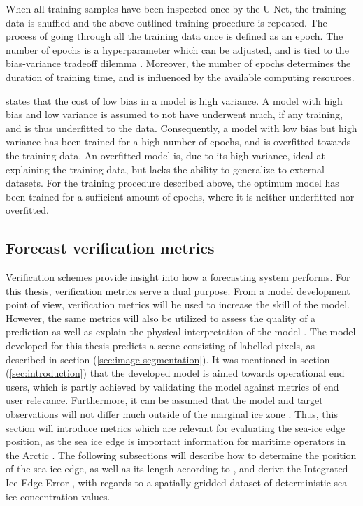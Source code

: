 \documentclass[../main/thesis.tex]{subfiles}
\begin{document}
When all training samples have been inspected once by the U-Net, the training data is shuffled and the above outlined training procedure is repeated. The process of going through all the training data once is defined as an epoch. The number of epochs is a hyperparameter which can be adjusted, and is tied to the bias-variance tradeoff dilemma \citep{Geman1992}. Moreover, the number of epochs determines the duration of training time, and is influenced by the available computing resources.

\citet{Geman1992} states that the cost of low bias in a model is high variance. A model with high bias and low variance is assumed to not have underwent much, if any training, and is thus underfitted to the data. Consequently, a model with low bias but high variance has been trained for a high number of epochs, and is overfitted towards the training-data. An overfitted model is, due to its high variance, ideal at explaining the training data, but lacks the ability to generalize to external datasets. For the training procedure described above, the optimum model has been trained for a sufficient amount of epochs, where it is neither underfitted nor overfitted.

\subsection{Forecast verification metrics}
Verification schemes provide insight into how a forecasting system performs. For this thesis, verification metrics serve a dual purpose. From a model development point of view, verification metrics will be used to increase the skill of the model. However, the same metrics will also be utilized to assess the quality of a prediction as well as explain the physical interpretation of the model \citep{Casati2008}. The model developed for this thesis predicts a scene consisting of labelled pixels, as described in section (\ref{sec:image-segmentation}). It was mentioned in section (\ref{sec:introduction}) that the developed model is aimed towards operational end users, which is partly achieved by validating the model against metrics of end user relevance. Furthermore, it can be assumed that the model and target observations will not differ much outside of the marginal ice zone \citep{Fritzner2020}. Thus, this section will introduce metrics which are relevant for evaluating the sea-ice edge position, as the sea ice edge is important information for maritime operators in the Arctic \citep{Melsom2019}. The following subsections will describe how to determine the position of the sea ice edge, as well as its length according to \citet{Melsom2019}, and derive the Integrated Ice Edge Error \citep{Goessling2016}, with regards to a spatially gridded dataset of deterministic sea ice concentration values.
\end{document}
